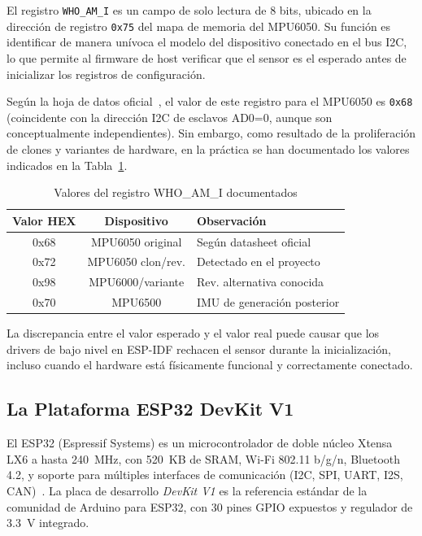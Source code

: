 \documentclass[10pt,twocolumn,a4paper]{article}
\begin{document}
El registro \texttt{WHO\_AM\_I} es un campo de solo lectura de 8 bits,
ubicado en la dirección de registro \texttt{0x75} del mapa de memoria
del MPU6050. Su función es identificar de manera unívoca el modelo del
dispositivo conectado en el bus I2C, lo que permite al firmware de host
verificar que el sensor es el esperado antes de inicializar los
registros de configuración.

Según la hoja de datos oficial~\cite{invensense2013}, el valor de este
registro para el MPU6050 es \texttt{0x68} (coincidente con la dirección
I2C de esclavos AD0=0, aunque son conceptualmente independientes). Sin
embargo, como resultado de la proliferación de clones y variantes de
hardware, en la práctica se han documentado los valores indicados en
la Tabla~\ref{tab:who}.

\begin{table}[H]
\centering
\caption{Valores del registro WHO\_AM\_I documentados}
\label{tab:who}
\scriptsize
\begin{tabular}{ccp{2.8cm}}
\toprule
\textbf{Valor HEX} & \textbf{Dispositivo} & \textbf{Observación} \\
\midrule
0x68 & MPU6050 original & Según datasheet oficial \\
0x72 & MPU6050 clon/rev. & Detectado en el proyecto \\
0x98 & MPU6000/variante & Rev. alternativa conocida \\
0x70 & MPU6500 & IMU de generación posterior \\
\bottomrule
\end{tabular}
\end{table}

La discrepancia entre el valor esperado y el valor real puede causar
que los drivers de bajo nivel en ESP-IDF rechacen el sensor durante la
inicialización, incluso cuando el hardware está físicamente funcional
y correctamente conectado.

\subsection{La Plataforma ESP32 DevKit V1}

El ESP32 (Espressif Systems) es un microcontrolador de doble núcleo
Xtensa LX6 a hasta 240~MHz, con 520~KB de SRAM, Wi-Fi 802.11 b/g/n,
Bluetooth 4.2, y soporte para múltiples interfaces de comunicación
(I2C, SPI, UART, I2S, CAN)~\cite{espressif2023}. La placa de desarrollo
\textit{DevKit V1} es la referencia estándar de la comunidad de Arduino
para ESP32, con 30 pines GPIO expuestos y regulador de 3.3~V integrado.
\end{document}
